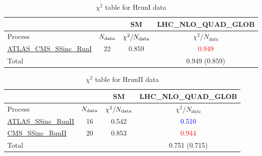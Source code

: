 \documentclass{article}
\begin{document}
\begin{table}[H]
\centering
\begin{tabular}{|l|c|c|c|}
\hline
 \multicolumn{2}{|c|}{} & SM& LHC_NLO_QUAD_GLOB\\ \hline
Process & $N_{\rm data}$ & $\chi^ 2/N_{\rm data}$& $\chi^ 2/N_{data}$\\ \hline
\href{https://arxiv.org}{ATLAS_CMS_SSinc_RunI} & 22 & 0.859 & \textcolor{red}                            {0.949} \\ \hline
\hline Total & &  & 0.949 (0.859) \\ \hline
\end{tabular}
\caption{$\chi^2$ table for HrunI data}
\end{table}
\begin{table}[H]
\centering
\begin{tabular}{|l|c|c|c|}
\hline
 \multicolumn{2}{|c|}{} & SM& LHC_NLO_QUAD_GLOB\\ \hline
Process & $N_{\rm data}$ & $\chi^ 2/N_{\rm data}$& $\chi^ 2/N_{data}$\\ \hline
\href{https://arxiv.org}{ATLAS_SSinc_RunII} & 16 & 0.542 & \textcolor{blue}                            {0.510} \\ \hline
\href{https://arxiv.org}{CMS_SSinc_RunII} & 20 & 0.853 & \textcolor{red}                            {0.944} \\ \hline
\hline Total & &  & 0.751 (0.715) \\ \hline
\end{tabular}
\caption{$\chi^2$ table for HrunII data}
\end{table}
\end{document}
